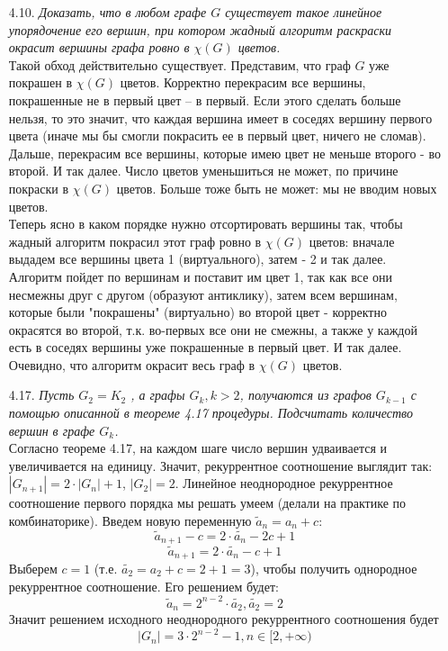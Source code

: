 \documentclass[10pt,a4paper]{article}
\begin{document}
\begin{enumerate}
	\item[4.10.] \textit{Доказать, что в любом графе $G$ существует такое линейное упорядочение его вершин, при котором жадный алгоритм раскраски окрасит вершины графа ровно в $\chi(G)$ цветов.}\\
	Такой обход действительно существует. Представим, что граф $G$ уже покрашен в $\chi(G)$ цветов. Корректно перекрасим все вершины, покрашенные не в первый цвет -- в первый. Если этого сделать больше нельзя, то это значит, что каждая вершина имеет в соседях вершину первого цвета (иначе мы бы смогли покрасить ее в первый цвет, ничего не сломав). Дальше, перекрасим все вершины, которые имею цвет не меньше второго - во второй. И так далее. Число цветов уменьшиться не может, по причине покраски в $\chi(G)$ цветов. Больше тоже быть не может: мы не вводим новых цветов.\\
	Теперь ясно в каком порядке нужно отсортировать вершины так, чтобы жадный алгоритм покрасил этот граф ровно в $\chi(G)$ цветов: вначале выдадем все вершины цвета 1 (виртуального), затем - 2 и так далее.\\
	Алгоритм пойдет по вершинам и поставит им цвет 1, так как все они несмежны друг с другом (образуют антиклику), затем всем вершинам, которые были "покрашены" (виртуально) во второй цвет - корректно окрасятся во второй, т.к. во-первых все они не смежны, а также у каждой есть в соседях вершины уже покрашенные в первый цвет. И так далее. Очевидно, что алгоритм окрасит весь граф в $\chi(G)$ цветов.
	
	\item[4.17.] \textit{Пусть $G_2 = K_2$ , а графы $G_k, k > 2$, получаются из графов $G_{k-1}$ с помощью описанной в теореме 4.17 процедуры. Подсчитать количество вершин в графе $G_k$.}\\
	Согласно теореме 4.17, на каждом шаге число вершин удваивается и увеличивается на единицу. Значит, рекуррентное соотношение выглядит так: $|G_{n+1}| = 2 \cdot |G_n| + 1$, $|G_2| = 2$. Линейное неоднородное рекуррентное соотношение первого порядка мы решать умеем (делали на практике по комбинаторике). Введем новую переменную $\tilde{a}_n = a_n + c$:
	\[ \tilde{a}_{n+1} - c = 2 \cdot \tilde{a_n} - 2c  + 1 \]
	\[ \tilde{a}_{n+1} = 2 \cdot \tilde{a_n} - c  + 1 \]
	Выберем $c = 1$ (т.е. $\tilde{a_2} = a_2 +c = 2 + 1 = 3$), чтобы получить однородное рекуррентное соотношение. Его решением будет:
	\[ \tilde{a}_{n} = 2^{n-2} \cdot \tilde{a_2}, \tilde{a_2} = 2\]
	Значит решением исходного неоднородного рекуррентного соотношения будет
	\[ |G_n| = 3 \cdot 2^{n-2} - 1, n \in [2, + \infty) \]
\end{enumerate}
\end{document}
